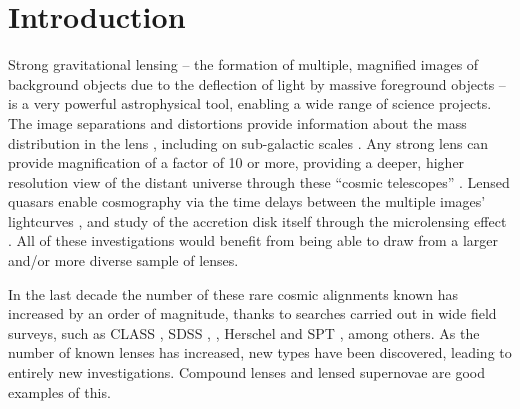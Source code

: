 \documentclass[useAMS,usenatbib,a4paper]{mn2e}
\begin{document}

\section{Introduction}
\label{sec:intro}


Strong gravitational lensing -- the formation of multiple, magnified images of
background objects due to the deflection of light by  massive foreground
objects -- is a very powerful astrophysical tool, enabling a wide range of
science projects. The image separations and distortions provide information
about the mass distribution in the lens \citep[e.g.][]{AugerEtal2010,
SonnenfeldEtal2012,MoreEtal2012,SonnenfeldEtal2013}, including on sub-galactic scales
\citep[e.g.][]{Dalal+Kochanek2002,VegettiEtal2010,HezavehEtal2013}. Any strong
lens can provide magnification of a factor of 10 or more, providing a deeper,
higher resolution view of the distant universe through these ``cosmic
telescopes'' \citep[e.g.][]{StarkEtal2008,NewtonEtal2011}. Lensed quasars
enable cosmography via the time delays between the multiple images'
lightcurves \citep[e.g.][]{TewesEtal2013,SuyuEtal2013}, and study of the
accretion disk itself through the microlensing effect
\citep[e.g.][]{PoindexterEtal2008}. All of these investigations would
benefit from being able to draw from a larger and/or more diverse sample of lenses.

In the last decade the number of these rare cosmic alignments known
has increased by an order of magnitude, thanks to searches carried out in
wide field surveys, such as
CLASS \citep[e.g.]{BrowneEtal2003}, SDSS \citep[e.g.][]
{BoltonEtal2006,AugerEtal2010b,TreuEtal2011,InadaEtal2012,
HennawiEtal2008,BelokurovEtal2009,DiehlEtal2009,FurlanettoEtal2013},
\cfhtls \citep[e.g.][]{MoreEtal2012,GavazziEtal2014}, Herschel
\citep[][]{NegrelloEtal2014} and SPT \citep[e.g.][]{VieiraEtal2013}, among
others.  As the number of known lenses has increased, new types have been
discovered, leading to entirely new investigations. Compound lenses
\citep{GavazziEtal2008,CollettEtal2012} and lensed supernovae
\citep{QuimbyEtal2014,KellyEtal2015} are good examples of this.
\end{document}
